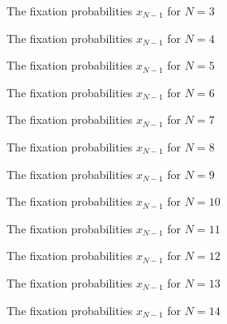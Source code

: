\documentclass[10pt,letterpaper]{article}
\begin{document}
\begin{figure}[!hbtp]
    \centering
    \caption{The fixation probabilities \(x_{N-1}\) for \(N=3\)}
    \label{resistance-3}
\end{figure}

\begin{figure}[!hbtp]
    \centering
    \caption{The fixation probabilities \(x_{N-1}\) for \(N=4\)}
\end{figure}

\begin{figure}[!hbtp]
    \centering
    \caption{The fixation probabilities \(x_{N-1}\) for \(N=5\)}
\end{figure}

\begin{figure}[!hbtp]
    \centering
    \caption{The fixation probabilities \(x_{N-1}\) for \(N=6\)}
\end{figure}

\begin{figure}[!hbtp]
    \centering
    \caption{The fixation probabilities \(x_{N-1}\) for \(N=7\)}
\end{figure}

\begin{figure}[!hbtp]
    \centering
    \caption{The fixation probabilities \(x_{N-1}\) for \(N=8\)}
\end{figure}

\begin{figure}[!hbtp]
    \centering
    \caption{The fixation probabilities \(x_{N-1}\) for \(N=9\)}
\end{figure}

\begin{figure}[!hbtp]
    \centering
    \caption{The fixation probabilities \(x_{N-1}\) for \(N=10\)}
\end{figure}

\begin{figure}[!hbtp]
    \centering
    \caption{The fixation probabilities \(x_{N-1}\) for \(N=11\)}
\end{figure}

\begin{figure}[!hbtp]
    \centering
    \caption{The fixation probabilities \(x_{N-1}\) for \(N=12\)}
\end{figure}

\begin{figure}[!hbtp]
    \centering
    \caption{The fixation probabilities \(x_{N-1}\) for \(N=13\)}
\end{figure}

\begin{figure}[!hbtp]
    \centering
    \caption{The fixation probabilities \(x_{N-1}\) for \(N=14\)}
    \label{resistance-14}
\end{figure}
\end{document}
